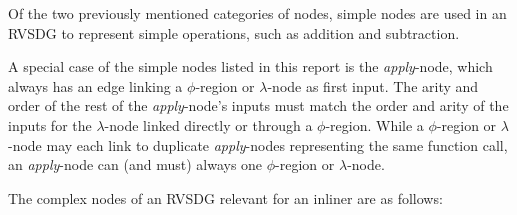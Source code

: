Of the two previously mentioned categories of nodes, simple nodes are used in an
RVSDG to represent simple operations, such as addition and subtraction.

A special case of the simple nodes listed in this report is the
\textit{apply}-node, which always has an edge linking a $\phi$-region or
$\lambda$-node as first input. The arity and order of the rest of the
\textit{apply}-node's inputs must match the order and arity of the inputs for
the $\lambda$-node linked directly or through a $\phi$-region. While a
$\phi$-region or $\lambda$-node may each link to duplicate \textit{apply}-nodes
representing the same function call, an \textit{apply}-node can (and must)
always one $\phi$-region or $\lambda$-node.

The complex nodes of an RVSDG relevant for an inliner are as follows:

